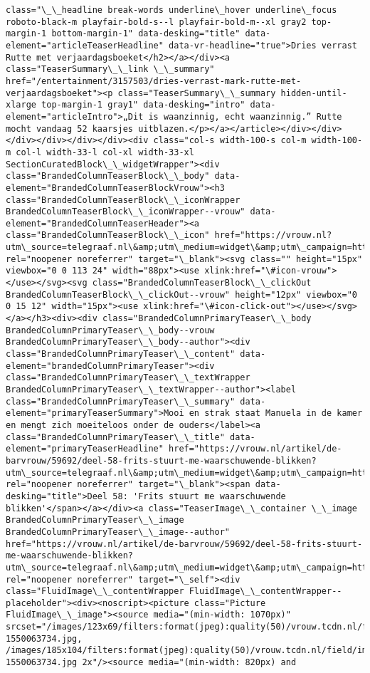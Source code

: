 \documentclass[11pt]{article}
\begin{document}
\begin{Verbatim}[commandchars=\\\{\}]
class="\_\_headline break-words underline\_hover underline\_focus roboto-black-m playfair-bold-s--l playfair-bold-m--xl gray2 top-margin-1 bottom-margin-1" data-desking="title" data-element="articleTeaserHeadline" data-vr-headline="true">Dries verrast Rutte met verjaardagsboeket</h2></a></div><a class="TeaserSummary\_\_link \_\_summary" href="/entertainment/3157503/dries-verrast-mark-rutte-met-verjaardagsboeket"><p class="TeaserSummary\_\_summary hidden-until-xlarge top-margin-1 gray1" data-desking="intro" data-element="articleIntro">„Dit is waanzinnig, echt waanzinnig.” Rutte mocht vandaag 52 kaarsjes uitblazen.</p></a></article></div></div></div></div></div></div><div class="col-s width-100-s col-m width-100-m col-l width-33-l col-xl width-33-xl SectionCuratedBlock\_\_widgetWrapper"><div class="BrandedColumnTeaserBlock\_\_body" data-element="BrandedColumnTeaserBlockVrouw"><h3 class="BrandedColumnTeaserBlock\_\_iconWrapper BrandedColumnTeaserBlock\_\_iconWrapper--vrouw" data-element="BrandedColumnTeaserHeader"><a class="BrandedColumnTeaserBlock\_\_icon" href="https://vrouw.nl?utm\_source=telegraaf.nl\&amp;utm\_medium=widget\&amp;utm\_campaign=https://www.telegraaf.nl/" rel="noopener noreferrer" target="\_blank"><svg class="" height="15px" viewbox="0 0 113 24" width="88px"><use xlink:href="\#icon-vrouw"></use></svg><svg class="BrandedColumnTeaserBlock\_\_clickOut BrandedColumnTeaserBlock\_\_clickOut--vrouw" height="12px" viewbox="0 0 15 12" width="15px"><use xlink:href="\#icon-click-out"></use></svg></a></h3><div><div class="BrandedColumnPrimaryTeaser\_\_body BrandedColumnPrimaryTeaser\_\_body--vrouw BrandedColumnPrimaryTeaser\_\_body--author"><div class="BrandedColumnPrimaryTeaser\_\_content" data-element="brandedColumnPrimaryTeaser"><div class="BrandedColumnPrimaryTeaser\_\_textWrapper BrandedColumnPrimaryTeaser\_\_textWrapper--author"><label class="BrandedColumnPrimaryTeaser\_\_summary" data-element="primaryTeaserSummary">Mooi en strak staat Manuela in de kamer en mengt zich moeiteloos onder de ouders</label><a class="BrandedColumnPrimaryTeaser\_\_title" data-element="primaryTeaserHeadline" href="https://vrouw.nl/artikel/de-barvrouw/59692/deel-58-frits-stuurt-me-waarschuwende-blikken?utm\_source=telegraaf.nl\&amp;utm\_medium=widget\&amp;utm\_campaign=https://www.telegraaf.nl/" rel="noopener noreferrer" target="\_blank"><span data-desking="title">Deel 58: 'Frits stuurt me waarschuwende blikken'</span></a></div><a class="TeaserImage\_\_container \_\_image BrandedColumnPrimaryTeaser\_\_image BrandedColumnPrimaryTeaser\_\_image--author" href="https://vrouw.nl/artikel/de-barvrouw/59692/deel-58-frits-stuurt-me-waarschuwende-blikken?utm\_source=telegraaf.nl\&amp;utm\_medium=widget\&amp;utm\_campaign=https://www.telegraaf.nl/" rel="noopener noreferrer" target="\_self"><div class="FluidImage\_\_contentWrapper FluidImage\_\_contentWrapper--placeholder"><div><noscript><picture class="Picture FluidImage\_\_image"><source media="(min-width: 1070px)" srcset="/images/123x69/filters:format(jpeg):quality(50)/vrouw.tcdn.nl/field/image/5f387ec6247ab3ae90f25f43559eecdc-1550063734.jpg, /images/185x104/filters:format(jpeg):quality(50)/vrouw.tcdn.nl/field/image/5f387ec6247ab3ae90f25f43559eecdc-1550063734.jpg 2x"/><source media="(min-width: 820px) and 
\end{Verbatim}
\end{document}

